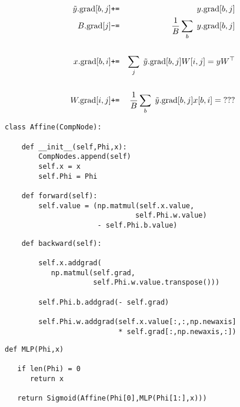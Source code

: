{\vspace{-2ex}
{\color{red}
\begin{eqnarray*}
  \tilde{y}.\mathrm{grad}[b,j] &\mbox{\tt +=} & y.\mathrm{grad}[b,j] \\
  B.\mathrm{grad}[j] & \mbox{\tt -=} & \frac{1}{B} \sum_b\;y.\mathrm{grad}[b,j] \\
  \\
  x.\mathrm{grad}[b,i] & \mbox{\tt +=} & \sum_j\;\tilde{y}.\mathrm{grad}[b,j]W[i,j] = yW^\top\\
  \\
  W.\mathrm{grad}[i,j] & \mbox{\tt +=} & \frac{1}{B} \sum_b\;\tilde{y}.\mathrm{grad}[b,j]x[b,i] =\; ???
\end{eqnarray*}
}

\vfill
\eject
\begin{verbatim}
class Affine(CompNode):

    def __init__(self,Phi,x):
        CompNodes.append(self)
        self.x = x
        self.Phi = Phi

    def forward(self):
        self.value = (np.matmul(self.x.value,
                               self.Phi.w.value)
                      - self.Phi.b.value)
\end{verbatim}
\vfill
\eject
\vfill
\begin{verbatim}
    def backward(self):

        self.x.addgrad(
           np.matmul(self.grad,
                     self.Phi.w.value.transpose()))

        self.Phi.b.addgrad(- self.grad)

        self.Phi.w.addgrad(self.x.value[:,:,np.newaxis]
                           * self.grad[:,np.newaxis,:])
\end{verbatim}



\begin{verbatim}
def MLP(Phi,x)

   if len(Phi) = 0
      return x

   return Sigmoid(Affine(Phi[0],MLP(Phi[1:],x)))
\end{verbatim}

}
